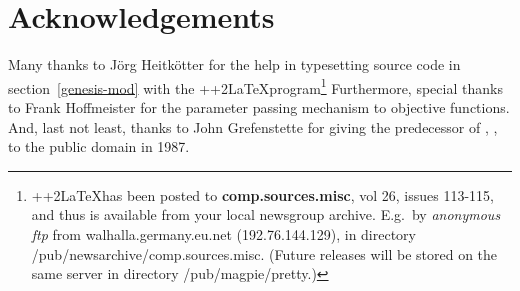 %
%

\section*{Acknowledgements}

Many thanks to J\"org Heitk\"otter for the help in typesetting source
code in section~\ref{genesis-mod} with the \C++2\LaTeX program\footnote{%
	\C++2\LaTeX has been posted to {\bf comp.sources.misc}, 
	vol 26, issues 113-115, and thus is available from your local 
	newsgroup archive.
	E.g.~by {\it anonymous ftp} from walhalla.germany.eu.net 
	(192.76.144.129), in directory /pub/newsarchive/comp.sources.misc.
	(Future releases will be stored on the same server in directory
	/pub/magpie/pretty.)}
Furthermore, special thanks to Frank Hoffmeister for the parameter 
passing mechanism to objective functions.
And, last not least, thanks to John Grefenstette for giving the
predecessor of \GEN, \Ogen, to the public domain in 1987.

